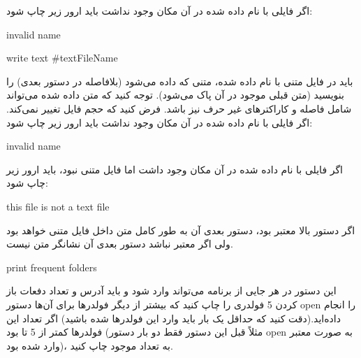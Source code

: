 \documentclass[]{article}
\begin{document}
اگر فایلی با نام داده شده در آن مکان وجود نداشت باید ارور زیر چاپ شود:

\begin{tcolorbox}[boxrule=0pt]
	\begin{latin}
  	  \large{
invalid name
		}
	\end{latin}
\end{tcolorbox}



\begin{tcolorbox}[boxrule=0pt]
	\begin{latin}
  	  \large{
write text \#textFileName
		}
	\end{latin}
\end{tcolorbox}

باید در فایل متنی با نام داده شده، متنی که داده می‌شود (بلافاصله در دستور بعدی) را بنویسید (متن قبلی موجود در آن پاک می‌شود). توجه کنید که متن داده شده می‌تواند شامل فاصله و کاراکترهای غیر حرف نیز باشد. فرض کنید که حجم فایل تغییر نمی‌کند.
اگر فایلی با نام داده شده در آن مکان وجود نداشت باید ارور زیر چاپ شود:

\begin{tcolorbox}[boxrule=0pt]
	\begin{latin}
  	  \large{
invalid name
		}
	\end{latin}
\end{tcolorbox}


اگر فایلی با نام داده شده در آن مکان وجود داشت اما فایل متنی نبود، باید ارور زیر چاپ شود:


\begin{tcolorbox}[boxrule=0pt]
	\begin{latin}
  	  \large{
this file is not a text file
		}
	\end{latin}
\end{tcolorbox}

اگر دستور بالا معتبر بود، دستور بعدی آن به طور کامل متن داخل فایل متنی خواهد بود ولی اگر معتبر نباشد دستور بعدی آن نشانگر متن نیست.

\begin{tcolorbox}[boxrule=0pt]
	\begin{latin}
  	  \large{
print frequent folders
		}
	\end{latin}
\end{tcolorbox}

این دستور در هر جایی از برنامه می‌تواند وارد شود و باید آدرس و تعداد دفعات باز کردن 5 فولدری را چاپ کنید که بیشتر از دیگر فولدرها برای آن‌ها دستور open را انجام داده‌اید.(دقت کنید که حداقل یک بار باید وارد این فولدرها شده باشید) اگر تعداد این فولدرها کمتر از 5 تا بود (مثلاً قبل این دستور فقط دو بار دستور open به صورت معتبر وارد شده بود)، به تعداد موجود چاپ کنید.
\end{document}
